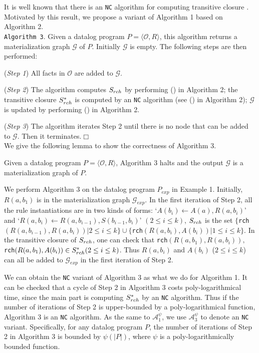 \documentclass{article}
\begin{document}
It is well known that there is an \texttt{NC} algorithm for computing transitive closure \cite{DBLP:conf/cie/Allender07}.
Motivated by this result, we propose a variant of Algorithm 1 based on Algorithm 2.\\

\noindent\texttt{Algorithm 3}. Given a datalog program $P=\langle\mathcal{O}, R\rangle$, this algorithm
returns a materialization graph $\mathcal{G}$ of $P$. Initially $\mathcal{G}$ is empty. The following steps are then performed:

(\emph{Step 1}) All facts in $\mathcal{O}$ are added to $\mathcal{G}$.

(\emph{Step 2}) The algorithm computes $S_{\tiny rch}$ by performing (\textbf{}) in Algorithm 2; the transitive closure $S^*_{\tiny rch}$ is computed by an \texttt{NC} algorithm (see (\textbf{}) in Algorithm 2); $\mathcal{G}$ is updated by performing (\textbf{}) in Algorithm 2.

(\emph{Step 3}) The algorithm iterates Step 2 until there is no node that can be added to $\mathcal{G}$. Then it terminates.\hfill$\Box$\\

We give the following lemma to show the correctness of Algorithm 3.

\begin{lemma}
Given a datalog program $P=\langle\mathcal{O}, R\rangle$, Algorithm 3 halts and the output $\mathcal{G}$ is a materialization graph of $P$.
\end{lemma}

\begin{example}
We perform Algorithm 3 on the datalog program $P_{exp}$ in Example 1. Initially, $R(a,b_1)$ is in the materialization graph $\mathcal{G}_{exp}$. In the first iteration of Step 2, all the rule instantiations are in two kinds of forms: `$A(b_{i})\leftarrow A(a),R(a,b_{i})$' and `$R(a,b_i)\leftarrow R(a,b_{i-1}),S(b_{i-1},b_i)$' $(2\leq i\leq k)$, $S_{\tiny rch}$ is the set $\{$\texttt{rch}$(R(a,b_{i-1}), R(a,b_i))|2\leq i\leq k\}\cup\{$\texttt{rch}$(R(a,b_i), A(b_i))|1\leq i\leq k\}$. In the transitive closure of $S_{\tiny rch}$,
one can check that \texttt{rch}$(R(a,b_1), R(a,b_i)),$\texttt{rch}$(R(a,b_1), A(b_i))\in S^*_{\tiny rch}(2\leq i\leq k)$. Thus $R(a,b_i)$ and $A(b_i)$ ($2\leq i\leq k$) can all be added to $\mathcal{G}_{exp}$ in the first iteration of Step 2.
\end{example}

We can obtain the \texttt{NC} variant of Algorithm 3 as what we do for Algorithm 1. It can be checked that a cycle
of Step 2 in Algorithm 3 costs poly-logarithmical time, since the main part is computing $S^*_{\tiny rch}$ by an \texttt{NC} algorithm. Thus if the number of iterations of Step 2 is upper-bounded by a poly-logarithmical function,
Algorithm 3 is an \texttt{NC} algorithm. As the same to $\mathcal{A}_1^{\psi}$, we use $\mathcal{A}_3^{\psi}$ to denote an \texttt{NC} variant. Specifically, for any datalog program $P$, the number of iterations of Step 2 in Algorithm 3 is
bounded by $\psi(|P|)$, where $\psi$ is a poly-logarithmically bounded function.
\end{document}
